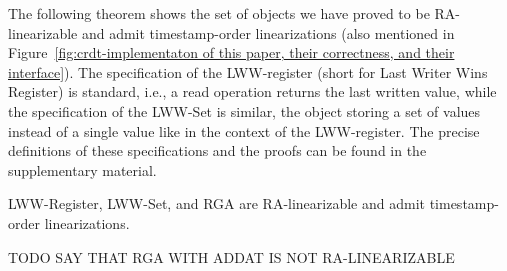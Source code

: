The following theorem shows the set of objects we have proved to be RA-linearizable and admit timestamp-order linearizations (also mentioned in Figure~\ref{fig:crdt-implementaton of this paper, their correctness, and their interface}). The specification of the LWW-register (short for Last Writer Wins Register) is standard, i.e., a read operation returns the last written value, while the specification of the LWW-Set is similar, the object storing a set of values instead of a single value like in the context of the LWW-register. The precise definitions of these specifications and the proofs can be found in the supplementary material.

\begin{theorem}\label{th:ts_order_objects}
LWW-Register, LWW-Set, and RGA are RA-linearizable and admit timestamp-order linearizations.
\end{theorem}

TODO SAY THAT RGA WITH ADDAT IS NOT RA-LINEARIZABLE

